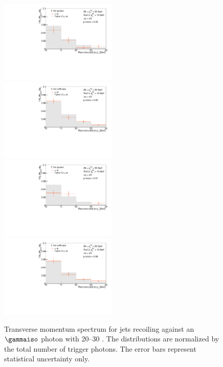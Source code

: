 \begin{figure}[h]
\centering
\includegraphics[width=0.495\textwidth]{GammaJet/Final_jetpt_step1_purity0_500_DATANAME_Out_Skimmed_17q_clus20_0_max30_0_JET_R0_4_PT_10_0_Iso1_5_root_WithMC}
\includegraphics[width=0.495\textwidth]{GammaJet/Final_jetpt_step1_purity0_500_DATANAME_Out_Skimmed_13def_clus20_0_max30_0_JET_R0_4_PT_10_0_Iso1_5_root_WithMC}\\
\includegraphics[width=0.495\textwidth]
{GammaJet/Final_jetpt_step1_purity0_500_DATANAME_Out_Skimmed_17q_clus20_0_max30_0_JET_R0_3_PT_10_0_Iso1_5_root_WithMC}
\includegraphics[width=0.495\textwidth]{GammaJet/Final_jetpt_step1_purity0_500_DATANAME_Out_Skimmed_13def_clus20_0_max30_0_JET_R0_3_PT_10_0_Iso1_5_root_WithMC}
\caption{Transverse momentum spectrum for jets recoiling against an $\gammaiso$ photon with 20--30 \GeVc. The distributions are normalized by the total number of trigger photons. The error bars represent statistical uncertainty only.}
\label{fig:ResultRecoLevel_jetpt}
\end{figure}


